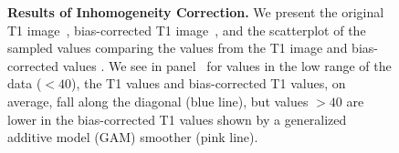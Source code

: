 \begin{figure}
\hfill
\hfill
\caption{{\bf Results of Inhomogeneity Correction.}  We present the original T1 image~\protect{}, bias-corrected T1 image~\protect{}, and the scatterplot of the sampled values comparing the values from the T1 image and bias-corrected values \protect{}.  We see in panel~\protect{} for values in the low range of the data ($< 40$), the T1 values and bias-corrected T1 values, on average, fall along the diagonal (blue line), but values $> 40$ are lower in the bias-corrected T1 values shown by a generalized additive model (GAM) smoother (pink line).  }
\label{fig:bias_correct}
\end{figure}




